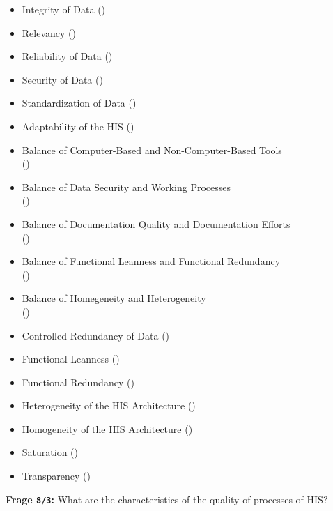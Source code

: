 \begin{itemize}
  \item Integrity of Data ()
  \item Relevancy ()
  \item Reliability of Data ()
  \item Security of Data ()
  \item Standardization of Data ()
  \item Adaptability of the HIS ()
  \item Balance of Computer-Based and Non-Computer-Based Tools \\
  ()
  \item Balance of Data Security and Working Processes \\
  ()
  \item Balance of Documentation Quality and Documentation Efforts \\
  ()
  \item Balance of Functional Leanness and Functional Redundancy \\
  ()
  \item Balance of Homegeneity and Heterogeneity \\
  ()
  \item Controlled Redundancy of Data ()
  \item Functional Leanness ()
  \item Functional Redundancy ()
  \item Heterogeneity of the HIS Architecture ()
  \item Homogeneity of the HIS Architecture ()
  \item Saturation ()
  \item Transparency ()
\end{itemize}

\textbf{Frage \texttt{8/3}:} What are the characteristics of the quality of processes of HIS?

